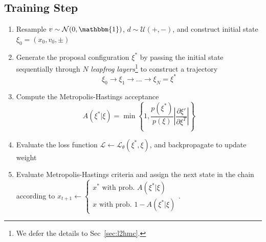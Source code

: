 \documentclass[a4paper,11pt]{article}
\begin{document}
\subsection{\label{subsec:trainstep}Training Step}
%
\begin{enumerate}
    \item Resample \(v \sim \mathcal{N} (0, \mathbbm{1})\),
        \(d \sim \mathcal{U} (+, -)\), and construct initial state
        \(\xi_{0} = (x_{0}, v_{0}, \pm)\)
    \item Generate the proposal configuration \(\xi^{\ast}\) by passing the
        initial state sequentially through \(N\) \emph{leapfrog
        layers}\footnote{
            We defer the details to Sec~\ref{sec:l2hmc}.
        } to construct a trajectory
        \begin{equation}
            \xi_{0} \rightarrow \xi_{1} \rightarrow \ldots \rightarrow%
            \xi_{N} = \xi^{\ast}
        \end{equation}
    \item Compute the Metropolis-Hastings acceptance
        \begin{equation}
            A(\xi^{\ast} | \xi) = 
            \min\left\{1,
            \frac{p(\xi^{\ast})}{p(\xi)}\left|\frac{\partial \xi'}{\partial \xi^{T}} \right| \right\}
            \label{eq:mhar}
        \end{equation}
    \item Evaluate the loss function \(\mathcal{L} \leftarrow
        \mathcal{L}_{\theta}(\xi^{\ast}, \xi)\), and backpropagate to update weight
    \item Evaluate Metropolis-Hastings criteria and assign the next state in
        the chain according to
        \(x_{t+1} \leftarrow \begin{cases}%
            x^{\ast} \text{ with prob. } A(\xi^{\ast}|\xi) \\
            x \text{ with prob. } 1 - A(\xi^{\ast}|\xi)
        \end{cases}\).
\end{enumerate}
%
%
\end{document}
